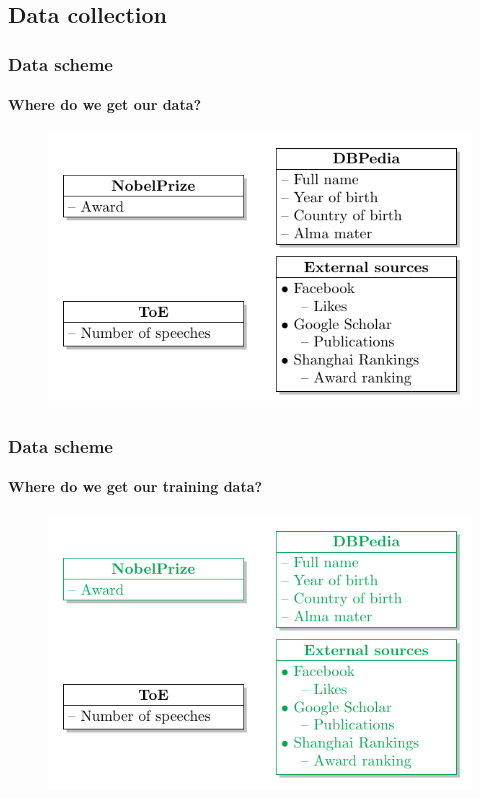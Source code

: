\documentclass[nonav,sleutel]{beamer}
\begin{document}
\subsection{Data collection}
\begin{frame}
\frametitle{Data scheme}
\framesubtitle{Where do we get our data?}

\begin{figure}
	\includegraphics{images/dataschema_original}
\end{figure}

\end{frame}

\begin{frame}
\frametitle{Data scheme}
\framesubtitle{Where do we get our \textbf{training} data?}

\begin{figure}
	\includegraphics{images/dataschema_training}
\end{figure}

\end{frame}
\end{document}
